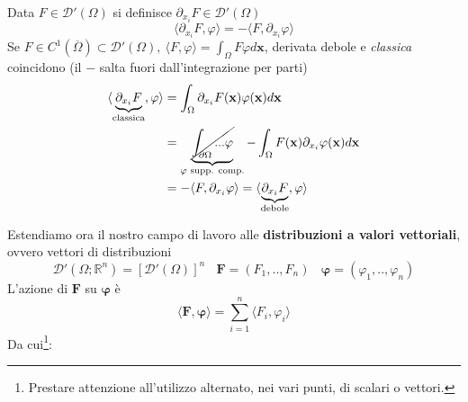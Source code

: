 \documentclass[10pt,a4paper,twoside,openright]{book}
\begin{document}
\begin{definition}
	 Data $\displaystyle F\in \mathcal{D}'( \Omega )$ si definisce $\displaystyle \partial _{x_{i}} F\in \mathcal{D} '( \Omega )$
	\begin{equation*}
		\langle \partial _{x_{i}} F,\varphi \rangle =-\langle F,\partial _{x_{i}} \varphi \rangle 
	\end{equation*}
	Se $\displaystyle F\in C^{1}(\overline{\Omega }) \subset \mathcal{D} '( \Omega ) ,\ \langle F,\varphi \rangle =\int _{\Omega } F\varphi d\mathbf{x}$, derivata debole e \textit{classica} coincidono (il $\displaystyle -$ salta fuori dall'integrazione per parti)
	\begin{align*}
		\langle \underbrace{\partial _{x_{i}} F}_{\text{classica}} ,\varphi \rangle & =\int _{\Omega } \partial _{x_{i}} F(\mathbf{x}) \varphi (\mathbf{x}) d\mathbf{x}                                                                              \\
		                                                                            & =\underbrace{\cancel{\int _{\partial \Omega } ...\varphi }}_{\varphi \text{ supp. comp.}} -\int _{\Omega } F(\mathbf{x}) \partial _{x_{i}} \varphi (\mathbf{x})d\mathbf{x} \\
		                                                                            & =-\langle F,\partial _{x_{i}} \varphi\rangle =\langle \underbrace{\partial _{x_{i}} F}_{\text{debole}} ,\varphi \rangle                                              
	\end{align*}
\end{definition}
Estendiamo ora il nostro campo di lavoro alle \textbf{distribuzioni a valori vettoriali}, ovvero vettori di distribuzioni 
\begin{equation*}
	\mathcal{D} '\left( \Omega ;\mathbb{R}^{n}\right) =[\mathcal{D} '( \Omega )]^{n} \ \ \ \ \mathbf{F} =( F_{1} ,..,F_{n}) \ \ \ \ \bm{\varphi } =( \varphi _{1} ,..,\varphi _{n})
\end{equation*}
L'azione di $\displaystyle \mathbf{F}$ su $\displaystyle \bm{\varphi }$ è 
\begin{equation*}
	\langle \mathbf{F} ,\bm{\varphi } \rangle =\sum ^{n}_{i=1} \langle F_{i} ,\varphi _{i} \rangle 
\end{equation*}
Da cui\footnote{Prestare attenzione all'utilizzo alternato, nei vari punti, di scalari o vettori.}:
\end{document}
